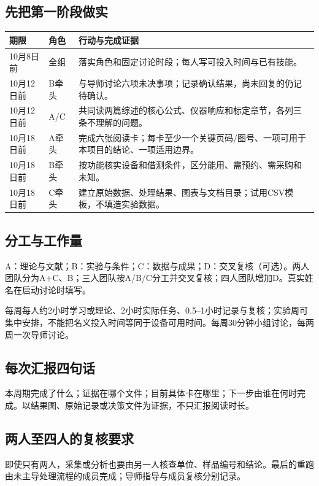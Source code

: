 \documentclass[UTF8,a4paper,11pt,fontset=fandol]{ctexart}
\begin{document}
\subsection*{先把第一阶段做实}
\begin{longtable}{P{2.3cm}P{2.1cm}P{9.7cm}}
\toprule
\textbf{期限} & \textbf{角色} & \textbf{行动与完成证据}\\\midrule\endhead
10月8日前 & 全组 & 落实角色和固定讨论时段；每人写可投入时间与已有技能。\\[0.35em]
10月12日前 & B牵头 & 与导师讨论六项未决事项；记录确认结果，尚未回复的仍记待确认。\\[0.35em]
10月12日前 & A/C & 共同读两篇综述的核心公式、仪器响应和标定章节，各列三条不理解的问题。\\[0.35em]
10月18日前 & A牵头 & 完成六张阅读卡；每卡至少一个关键页码/图号、一项可用于本项目的结论、一项适用边界。\\[0.35em]
10月18日前 & B牵头 & 按功能核实设备和借测条件，区分能用、需预约、需采购和未知。\\[0.35em]
10月18日前 & C牵头 & 建立原始数据、处理结果、图表与文档目录；试用CSV模板，不填造实验数据。\\[0.35em]
\bottomrule\end{longtable}
\subsection*{分工与工作量}
A：理论与文献；B：实验与条件；C：数据与成果；D：交叉复核（可选）。两人团队分为A+C、B；三人团队按A/B/C分工并交叉复核；四人团队增加D。真实姓名在启动讨论时填写。

每周每人约2小时学习或理论、2小时实际任务、0.5–1小时记录与复核；实验周可集中安排，不能把名义投入时间等同于设备可用时间。每周30分钟小组讨论，每两周一次导师讨论。

\subsection*{每次汇报四句话}
本周期完成了什么；证据在哪个文件；目前具体卡在哪里；下一步由谁在何时完成。以结果图、原始记录或决策文件为证据，不只汇报阅读时长。

\subsection*{两人至四人的复核要求}
即使只有两人，采集或分析也要由另一人核查单位、样品编号和结论。最后的重跑由未主导处理流程的成员完成；导师指导与成员复核分别记录。

\clearpage
\end{document}
